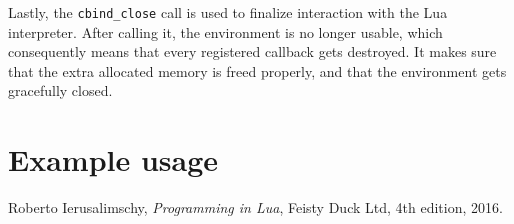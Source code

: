 \documentclass[polish, english]{iithesis}
\begin{document}
    Lastly, the \texttt{cbind\_close} call is used to finalize interaction with the Lua interpreter.
    After calling it, the environment is no longer usable, which consequently means that every registered callback gets destroyed.
    It makes sure that the extra allocated memory is freed properly, and that the environment gets gracefully closed.
\chapter{Example usage}

\begin{thebibliography}{42}
    Roberto Ierusalimschy,
    \emph{Programming in Lua},
    Feisty Duck Ltd,
    4th edition,
    2016.
\end{thebibliography}
\end{document}
